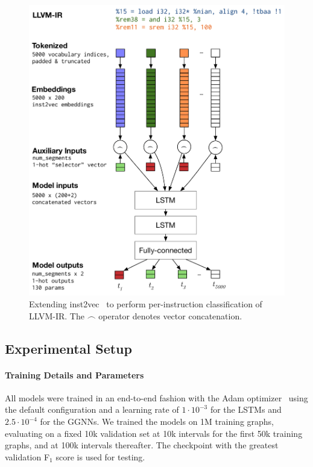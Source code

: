 \begin{figure}
  \centering %
  \includegraphics[width=\columnwidth]{images/lstm_node_level}%
  \caption{%
    Extending inst2vec~\citep{Ben-nun2018} to perform per-instruction
    classification of LLVM-IR. The $\frown$ operator denotes vector
    concatenation.%
  }%
  \label{figure:lstm_node_level}%
\end{figure}

\subsection{Experimental Setup}
\label{app:dataflow_experimental_setup}

\paragraph{Training Details and Parameters}
All models were trained in an end-to-end fashion with the Adam
optimizer~\citep{Kingma2015} using the default configuration and a learning rate
of $1\cdot10^{-3}$ for the LSTMs and $2.5\cdot 10^{-4}$ for the GGNNs. We
trained the models on 1M training graphs, evaluating on a fixed 10k validation
set at 10k intervals for the first 50k training graphs, and at 100k intervals
thereafter. The checkpoint with the greatest validation F$_1$ score is used for
testing.

